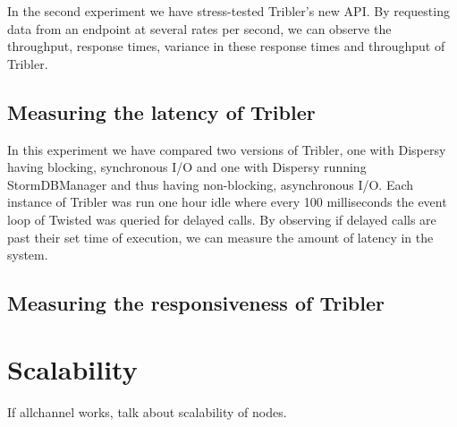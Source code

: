 In the second experiment we have stress-tested Tribler's new API.
By requesting data from an endpoint at several rates per second, we can observe the throughput, response times, variance in these response times and throughput of Tribler.

\subsection{Measuring the latency of Tribler}

In this experiment we have compared two versions of Tribler, one with Dispersy having  blocking, synchronous I/O and one with Dispersy running StormDBManager and thus having non-blocking, asynchronous I/O.
Each instance of Tribler was run one hour idle where every 100 milliseconds the event loop of Twisted was queried for delayed calls.
By observing if delayed calls are past their set time of execution, we can measure the amount of latency in the system.

\subsection{Measuring the responsiveness of Tribler}



\section{Scalability}

If allchannel works, talk about scalability of nodes. 


